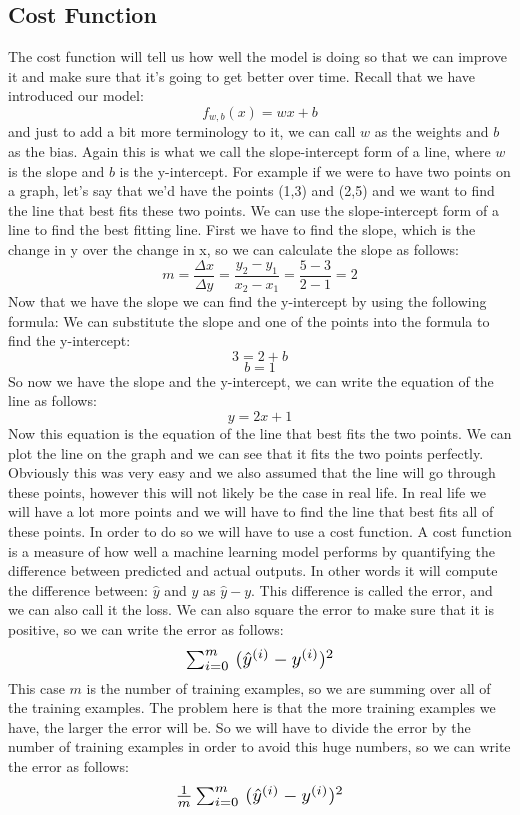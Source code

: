\subsection{Cost Function}
The cost function will tell us how well the model is doing so that we can improve it and make sure that it's going to get better over time.
Recall that we have introduced our model: $$ f_{w,b}(x) = wx + b $$ and just to add a bit more terminology to it, we can call $w$ as the weights and $b$ as the bias.
Again this is what we call the slope-intercept form of a line, where $w$ is the slope and $b$ is the y-intercept.
For example if we were to have two points on a graph, let's say that we'd have the points (1,3) and (2,5) and we want to find the line that best fits these two points. We can use the slope-intercept form of a line to find the best fitting line.
First we have to find the slope, which is the change in y over the change in x, so we can calculate the slope as follows:
$$ m=\frac{\Delta x}{\Delta y}=\frac{y_2-y_1}{x_2-x_1}={\frac{5-3}{2-1}}=2 $$
Now that we have the slope we can find the y-intercept by using the following formula:
We can substitute the slope and one of the points into the formula to find the y-intercept:
$$ 3=2+b $$
$$ b=1 $$
So now we have the slope and the y-intercept, we can write the equation of the line as follows:
$$ y=2x+1 $$
Now this equation is the equation of the line that best fits the two points. We can plot the line on the graph and we can see that it fits the two points perfectly.
Obviously this was very easy and we also assumed that the line will go through these points, however this will not likely be the case in real life.
In real life we will have a lot more points and we will have to find the line that best fits all of these points. In order to do so we will have to use a cost function.
A cost function is a measure of how well a machine learning model performs by quantifying the difference between predicted and actual outputs.
In other words it will compute the difference between: $\hat{y}$ and $y$ as $\hat{y}-y$.
This difference is called the error, and we can also call it the loss.
We can also square the error to make sure that it is positive, so we can write the error as follows:
\begin{align*}
  \scalebox{1.3}{$
    \sum_{i=0}^{m}\ (\hat{y}^{(i)}-y^{(i)})^2
  $}
\end{align*}
This case $m$ is the number of training examples, so we are summing over all of the training examples.
The problem here is that the more training examples we have, the larger the error will be. So we will have to divide the error by the number of training examples in order to avoid this huge numbers, so we can write the error as follows:
\begin{align*}
  \scalebox{1.3}{$
    \frac{1}{m}\sum_{i=0}^{m}\ (\hat{y}^{(i)}-y^{(i)})^2
  $}
\end{align*}

